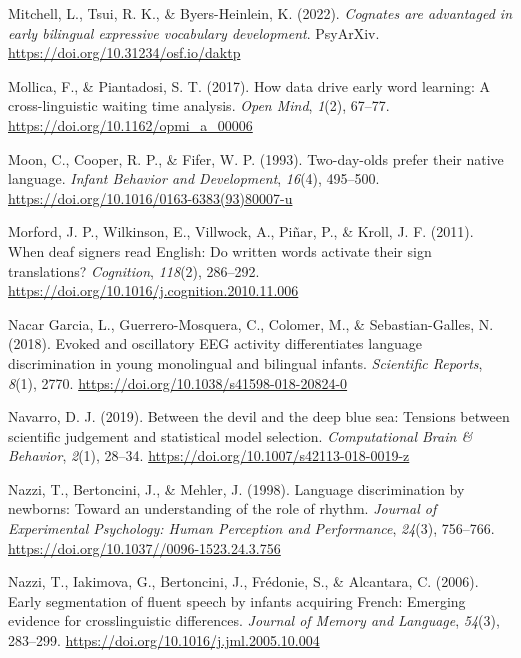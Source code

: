 \documentclass[
  12pt,
  b5paperpaper,
  twoside]{scrreprt}
\newlength{\cslhangindent}
\newlength{\cslentryspacingunit} %
\newenvironment{CSLReferences}[2] %
 {%
  \setlength{\parindent}{0pt}
  \ifodd #1
  \let\oldpar\par
  \def\par{\hangindent=\cslhangindent\oldpar}
  \fi
  \setlength{\parskip}{#2\cslentryspacingunit}
 }%
 {}
\begin{document}
\begin{CSLReferences}{1}{0}
\leavevmode{}%
Mitchell, L., Tsui, R. K., \& Byers-Heinlein, K. (2022). \emph{Cognates
are advantaged in early bilingual expressive vocabulary development}.
{PsyArXiv}. \url{https://doi.org/10.31234/osf.io/daktp}

\leavevmode{}%
Mollica, F., \& Piantadosi, S. T. (2017). How data drive early word
learning: A cross-linguistic waiting time analysis. \emph{Open Mind},
\emph{1}(2), 67--77. \url{https://doi.org/10.1162/opmi_a_00006}

\leavevmode{}%
Moon, C., Cooper, R. P., \& Fifer, W. P. (1993). Two-day-olds prefer
their native language. \emph{Infant Behavior and Development},
\emph{16}(4), 495--500.
\url{https://doi.org/10.1016/0163-6383(93)80007-u}

\leavevmode{}%
Morford, J. P., Wilkinson, E., Villwock, A., Piñar, P., \& Kroll, J. F.
(2011). When deaf signers read {English}: Do written words activate
their sign translations? \emph{Cognition}, \emph{118}(2), 286--292.
\url{https://doi.org/10.1016/j.cognition.2010.11.006}

\leavevmode{}%
Nacar Garcia, L., Guerrero-Mosquera, C., Colomer, M., \&
Sebastian-Galles, N. (2018). Evoked and oscillatory {EEG} activity
differentiates language discrimination in young monolingual and
bilingual infants. \emph{Scientific Reports}, \emph{8}(1), 2770.
\url{https://doi.org/10.1038/s41598-018-20824-0}

\leavevmode{}%
Navarro, D. J. (2019). Between the devil and the deep blue sea: Tensions
between scientific judgement and statistical model selection.
\emph{Computational Brain \& Behavior}, \emph{2}(1), 28--34.
\url{https://doi.org/10.1007/s42113-018-0019-z}

\leavevmode{}%
Nazzi, T., Bertoncini, J., \& Mehler, J. (1998). Language discrimination
by newborns: Toward an understanding of the role of rhythm.
\emph{Journal of Experimental Psychology: Human Perception and
Performance}, \emph{24}(3), 756--766.
\url{https://doi.org/10.1037//0096-1523.24.3.756}

\leavevmode{}%
Nazzi, T., Iakimova, G., Bertoncini, J., Frédonie, S., \& Alcantara, C.
(2006). Early segmentation of fluent speech by infants acquiring
{French}: Emerging evidence for crosslinguistic differences.
\emph{Journal of Memory and Language}, \emph{54}(3), 283--299.
\url{https://doi.org/10.1016/j.jml.2005.10.004}


\end{CSLReferences}
\end{document}
